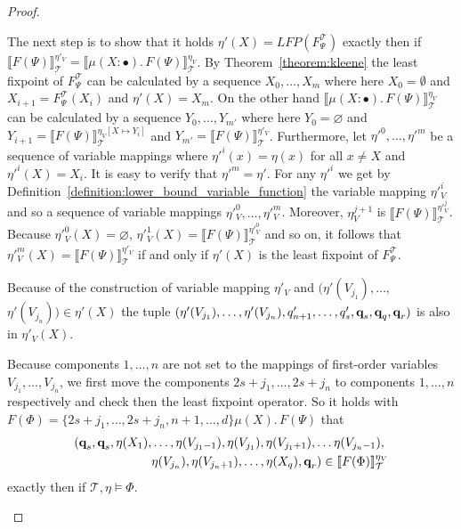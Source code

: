 \begin{proof}
\begin{compactitem}
        The next step is to show that it holds $\eta'(X) = LFP(F^\mathcal{T}_\Psi)$ exactly then if $\llbracket F(\Psi) \rrbracket^{\eta'_V}_\mathcal{T} = \llbracket \mu (X \colon \bullet).\,F(\Psi)\rrbracket_\mathcal{T}^{\eta_V}$. 
        By Theorem~\ref{theorem:kleene} the least fixpoint of $F^\mathcal{T}_\Psi$ can be calculated by a sequence $X_0, \dots, X_m$ where here $X_0 = \emptyset$ and $X_{i+1} 
        = F_\Psi^\mathcal{T}(X_i)$ and $\eta'(X) = X_m$. On the other hand $\llbracket \mu (X \colon \bullet).\,F(\Psi)\rrbracket_\mathcal{T}^{\eta_V}$ can be calculated by a sequence 
         $Y_0, \dots, Y_{m'}$ where here $Y_0 = \varnothing$ and $Y_{i+1} = \llbracket F(\Psi)\rrbracket_\mathcal{T}^{\eta_V[X \mapsto Y_i]}$ and $Y_{m'} = \llbracket F(\Psi)\rrbracket_\mathcal{T}^{\eta'_V}$. Furthermore, let $\eta'^0, \dots, \eta'^m$ be a sequence of variable mappings where $\eta'^i(x) = \eta(x)$ for all $x \neq X$ and $\eta'^i(X) = X_i$. It is easy to verify that $\eta'^m = \eta'$. For any $\eta'^i$ we get by Definition~\ref{definition:lower_bound_variable_function} the variable mapping $\eta'^i_V$ and so a sequence of variable mappings $\eta'^0_V, \dots, \eta'^m_V$. Moreover, $\eta^{j+1}_V$ is $\llbracket F(\Psi)\rrbracket_\mathcal{T}^{\eta'^j_V}$. Because $\eta'^0_V(X) = \varnothing$, $\eta'^1_V(X) =\llbracket F(\Psi)\rrbracket_\mathcal{T}^{\eta'^0_V}$ and so on, it follows that $\eta'^m_V(X) = \llbracket F(\Psi) \rrbracket^{\eta'_V}_\mathcal{T}$ if and only if $\eta'(X)$ is the least fixpoint of $F^\mathcal{T}_\Psi$.
         
Because of the construction of variable mapping $\eta'_V$ and $(\eta'(V_{j_1}), \dots, 
        $ $\eta'(V_{j_n})) \in \eta'(X)$ the
        tuple $(\eta'(V_{j_1}), \dots, \eta'(V_{j_n}), q_{n+1}', \dots, q_s', \emph{q}_s, \emph{q}_q, \emph{q}_r)$ is also in $\eta'_V(X)$.         
        
       Because components $1, \dots, n$ are not set to the mappings of first-order variables 
       $V_{j_1}, \dots, V_{j_n}$, we first move the components $2s+j_1, \dots, 2s+j_n$ to components $1, \dots, n$ respectively and check then the least fixpoint operator.
        So it holds with $F(\Phi) = \{2s+j_1, \dots, 2s+j_n, n+1, \dots, d\} \mu (X).\, F(\Psi)$ that
        \begin{align*}
            (\emph{q}_s, \emph{q}_s, \eta(X_1),& \dots, \eta(V_{j_1-1}), \eta(V_{j_1}), \eta(V_{j_1+1}), \dots \eta(V_{j_n-1}), \\&
             \eta(V_{j_n}), \eta(V_{j_n+1}), \dots, \eta
            (X_q), \emph{q}_r) \in \llbracket  F(\Phi) \rrbracket^{\eta_V
            }_\mathcal{T}
        \end{align*}
        exactly then if $\mathcal{T}, \eta \models \Phi$.


\end{compactitem}
\end{proof}
